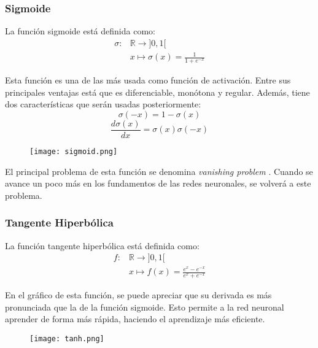 \subsubsection{Sigmoide}

La función sigmoide está definida como:
\begin{align*}
    \sigma \colon & \mathbb{R} \longrightarrow ]0,1[             \\
    \quad         & x \longmapsto \sigma(x) = \frac{1}{1+e^{-x}}
\end{align*}

Esta función es una de las más usada como función de activación. Entre sus principales ventajas está que es diferenciable, monótona y regular. Además, tiene dos características que serán usadas posteriormente:
\begin{equation} \label{sigmoid:1}
    \sigma(-x)=1-\sigma(x)
\end{equation}
\begin{equation} \label{sigmoid:2}
    \frac{d\sigma(x)}{dx}=\sigma(x)\sigma(-x)
\end{equation}

\begin{figure}[H]
    \texttt{[image: sigmoid.png]}
    \centering
\end{figure}

El principal problema de esta función se denomina \textit{vanishing problem} \cite{hochreiter1991untersuchungen}.
Cuando se avance un poco más en los fundamentos de las redes neuronales, se volverá a este problema.

\subsubsection{Tangente Hiperbólica}

La función tangente hiperbólica está definida como:
\begin{align*}
    f \colon & \mathbb{R} \longrightarrow ]0,1[                       \\
    \quad    & x \longmapsto f(x) = \frac{e^{x}-e^{-x}}{e^{x}+e^{-x}}
\end{align*}

En el gráfico de esta función, se puede apreciar que su derivada es más pronunciada que la de la función sigmoide. Esto permite a la red neuronal aprender de forma más rápida, haciendo el aprendizaje más eficiente.

\begin{figure}[H]
    \texttt{[image: tanh.png]}
    \centering
\end{figure}

